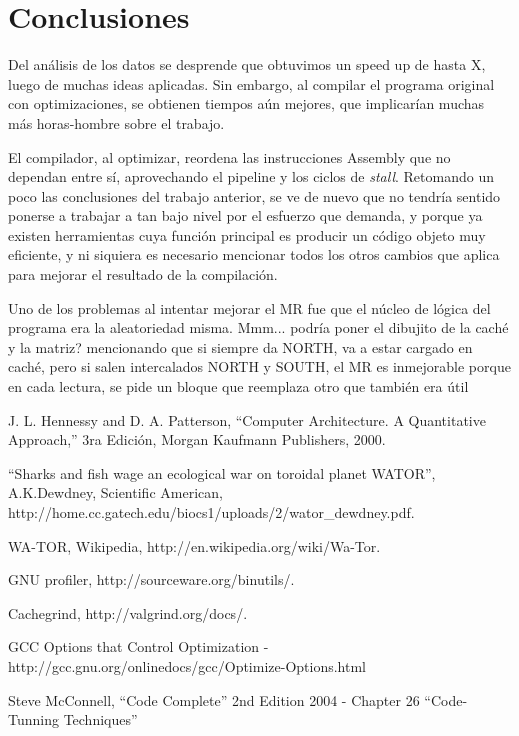 \documentclass[a4paper,10pt]{article}
\begin{document}
\section{Conclusiones}

    Del an\'alisis de los datos se desprende que obtuvimos un speed up de hasta X, luego de muchas ideas aplicadas. Sin embargo, al compilar el programa original con optimizaciones, se obtienen tiempos aún mejores, que implicar\'ian muchas más horas-hombre sobre el trabajo.


    El compilador, al optimizar, reordena las instrucciones Assembly que no dependan entre s\'i, aprovechando el pipeline y los ciclos de \textit{stall}. Retomando un poco las conclusiones del trabajo anterior, se ve de nuevo que no tendr\'ia sentido ponerse a trabajar a tan bajo nivel por el esfuerzo que demanda, y porque ya existen herramientas cuya funci\'on principal es producir un c\'odigo objeto muy eficiente, y ni siquiera es necesario mencionar todos los otros cambios que aplica para mejorar el resultado de la compilaci\'on.

    Uno de los problemas al intentar mejorar el MR fue que el n\'ucleo de l\'ogica del programa era la aleatoriedad misma. Mmm... podr\'ia poner el dibujito de la cach\'e y la matriz? mencionando que si siempre da NORTH, va a estar cargado en cach\'e, pero si salen intercalados NORTH y SOUTH, el MR es inmejorable porque en cada lectura, se pide un bloque que reemplaza otro que tambi\'en era \'util

    
\begin{thebibliography}{99}

 J. L. Hennessy and D. A. Patterson, ``Computer Architecture. A Quantitative
Approach,'' 3ra Edici\'on, Morgan Kaufmann Publishers, 2000.

 ``Sharks and fish wage an ecological war on toroidal planet WATOR'', A.K.Dewdney, Scientific American,\\
http://home.cc.gatech.edu/biocs1/uploads/2/wator\_dewdney.pdf.

 WA-TOR, Wikipedia, http://en.wikipedia.org/wiki/Wa-Tor.

 GNU profiler, http://sourceware.org/binutils/.

 Cachegrind, http://valgrind.org/docs/.

 GCC Options that Control Optimization - http://gcc.gnu.org/onlinedocs/gcc/Optimize-Options.html

 Steve McConnell, ``Code Complete'' 2nd Edition 2004 - Chapter 26 ``Code-Tunning Techniques''

\end{thebibliography}
\end{document}
